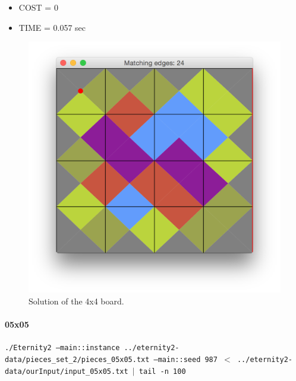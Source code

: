	\begin{itemize}
		\item COST = 0
		\item TIME = 0.057 sec
	\end{itemize}
	\begin{figure}[H]
	\centering
	\includegraphics[scale=0.25]{img/sol_04x04}
	\caption{Solution of the 4x4 board.}
	\end{figure}



	\paragraph{05x05}
	\texttt{./Eternity2 --main::instance ../eternity2-data/pieces\_set\_2/pieces\_05x05.txt --main::seed 987 $<$ ../eternity2-data/ourInput/input\_05x05.txt $\mid$ tail -n 100}

